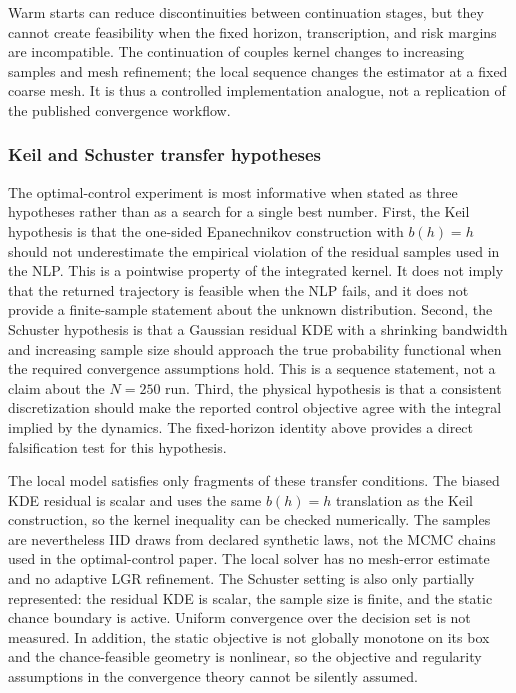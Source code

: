 Warm starts can reduce discontinuities between continuation stages, but they cannot create feasibility when the fixed horizon, transcription, and risk margins are incompatible. The continuation of \citet{keil2021warm} couples kernel changes to increasing samples and mesh refinement; the local sequence changes the estimator at a fixed coarse mesh. It is thus a controlled implementation analogue, not a replication of the published convergence workflow.

\subsubsection{Keil and Schuster transfer hypotheses}

The optimal-control experiment is most informative when stated as three hypotheses rather than as a search for a single best number. First, the Keil hypothesis is that the one-sided Epanechnikov construction with $b(h)=h$ should not underestimate the empirical violation of the residual samples used in the NLP. This is a pointwise property of the integrated kernel. It does not imply that the returned trajectory is feasible when the NLP fails, and it does not provide a finite-sample statement about the unknown distribution. Second, the Schuster hypothesis is that a Gaussian residual KDE with a shrinking bandwidth and increasing sample size should approach the true probability functional when the required convergence assumptions hold. This is a sequence statement, not a claim about the $N=250$ run. Third, the physical hypothesis is that a consistent discretization should make the reported control objective agree with the integral implied by the dynamics. The fixed-horizon identity above provides a direct falsification test for this hypothesis.

The local model satisfies only fragments of these transfer conditions. The biased KDE residual is scalar and uses the same $b(h)=h$ translation as the Keil construction, so the kernel inequality can be checked numerically. The samples are nevertheless IID draws from declared synthetic laws, not the MCMC chains used in the optimal-control paper. The local solver has no mesh-error estimate and no adaptive LGR refinement. The Schuster setting is also only partially represented: the residual KDE is scalar, the sample size is finite, and the static chance boundary is active. Uniform convergence over the decision set is not measured. In addition, the static objective is not globally monotone on its box and the chance-feasible geometry is nonlinear, so the objective and regularity assumptions in the convergence theory cannot be silently assumed.

